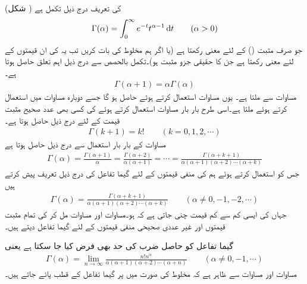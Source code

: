  (شکل )  کی تعریف درج ذیل تکمل ہے
\begin{align}\label{مساوات_ضمیمہ_گیما_تکمل_الف}
\Gamma(\alpha)=\int_{0}^{\infty} e^{-t}t^{\alpha-1}\dif t \quad \quad (\alpha>0)
\end{align}
جو صرف مثبت () کے لئے معنی رکھتا ہے (یا اگر ہم مخلوط  کی بات کریں تب یہ  کی ان قیمتوں کے لئے معنی رکھتا ہے جن  کا حقیقی جزو مثبت ہو)۔تکمل بالحصص سے درج ذیل اہم تعلق حاصل ہوتا ہے۔
\begin{align}\label{مساوات_ضمیمہ_گیما_تکمل_ب}
\Gamma(\alpha+1)=\alpha\Gamma(\alpha)
\end{align}
مساوات  سے  ملتا ہے۔ یوں مساوات  استعمال کرتے ہوئے  حاصل ہو گا جسے دوبارہ مساوات  میں استعمال کرتے ہوئے  ملتا ہے۔اسی طرح بار بار مساوات  استعمال کرتے ہوئے  کی کسی بھی عدد صحیح مثبت قیمت  کے لئے درج ذیل حاصل ہوتا ہے۔
\begin{align}\label{مساوات_ضمیمہ_گیما_تکمل_پ}
\Gamma(k+1)=k!\quad \quad (k=0,1,2,\cdots)
\end{align} 
مساوات  کے بار بار استعمال سے  درج ذیل حاصل ہوتا ہے
\begin{align*}
\Gamma(\alpha)=\frac{\Gamma(\alpha+1)}{\alpha}=\frac{\Gamma(\alpha+2)}{\alpha(\alpha+1)}=\cdots=\frac{\Gamma(\alpha+k+1)}{\alpha(\alpha+1)(\alpha+2)\cdots(\alpha+k)}
\end{align*}
جس کو استعمال کرتے ہوئے ہم  کی منفی قیمتوں کے لئے گیما تفاعل کی درج ذیل تعریف پیش کرتے ہیں
\begin{align}\label{مساوات_ضمیمہ_گیما_تکمل_ت}
\Gamma(\alpha)=\frac{\Gamma(\alpha+k+1)}{\alpha(\alpha+1)(\alpha+2)\cdots(\alpha+k)}\quad \quad (\alpha\ne 0, -1,-2,\cdots)
\end{align}
جہاں  کی ایسی کم سے کم قیمت چنی جاتی ہے کہ  ہو۔مساوات  اور مساوات  مل کر  کی تمام مثبت قیمتوں اور غیر عددی صحیحی منفی قیمتوں کے لئے گیما تفاعل دیتے ہیں۔

گیما تفاعل کو حاصل ضرب کی حد بھی فرض کیا جا سکتا ہے یعنی
\begin{align}\label{مساوات_ضمیمہ_گیما_تکمل_ٹ}
\Gamma(\alpha)=\lim_{n\to \infty} \frac{n! n^{\alpha}}{\alpha(\alpha+1)(\alpha+2)\cdots(\alpha+n)} \quad \quad (\alpha \ne 0, -1,\cdots)
\end{align}  
مساوات  اور مساوات  سے ظاہر ہے کہ مخلوط  کی صورت میں  پر گیما تفاعل کے قطب پائے جاتے ہیں۔

